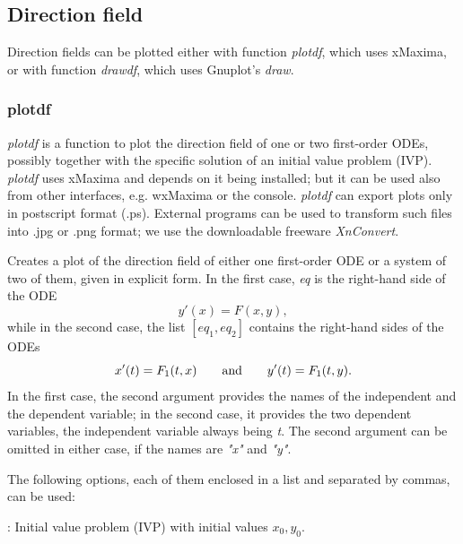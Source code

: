 \documentclass[../Maxima_Workbook.tex]{subfiles}
\begin{document}
\subsection{Direction field}

Direction fields can be plotted either with function \emph{plotdf}, which uses xMaxima, or with function \emph{drawdf}, which uses Gnuplot's \emph{draw}.

\subsubsection{plotdf}

\emph{plotdf} is a function to plot the direction field of one or two first-order ODEs, possibly together with the specific solution of an initial value problem (IVP). \emph{plotdf} uses xMaxima and depends on it being installed; but it can be used also from other interfaces, e.g. wxMaxima or the console. \emph{plotdf} can export plots only in postscript format (.ps). External programs can be used to transform such files into .jpg or .png format; we use the downloadable freeware \emph{XnConvert}. 

\lzz {} \hfill \tcr{[function]}

\lz Creates a plot of the direction field of either one first-order ODE or a system of two of them, given in explicit form. In the first case, \emph{eq} is the right-hand side of the ODE
\begin{equation*}
	y'(x) = F(x,y),
\end{equation*}
while in the second case, the list $ [eq_1,eq_2] $ contains the right-hand sides of the ODEs
\begin{equation*}
	x'(t) = F_1(t,x) \qquad \text{and} \qquad y'(t) = F_1(t,y).
\end{equation*}
In the first case, the second argument provides the names of the independent and the dependent variable; in the second case, it provides the two dependent variables, the independent variable always being \emph{t}. The second argument can be omitted in either case, if the names are \emph{"x"} and \emph{"y"}.

\lz The following options, each of them enclosed in a list and separated by commas, can be used:

\lz \tcr{[trajectory\_at,$ x_0,y_0 $]}: Initial value problem (IVP) with initial values $ x_0, y_0 $.
\end{document}
